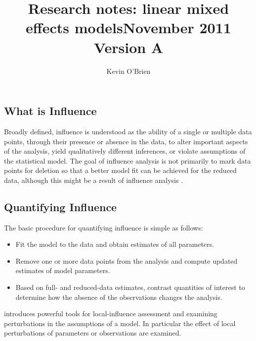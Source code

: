 \documentclass[12pt, a4paper]{report}
\title{Research notes: linear mixed effects models}
\author{ } \date{ }
\theoremstyle{plain}
\theoremstyle{definition}
\theoremstyle{remark}
\begin{document}
\author{Kevin O'Brien}
\title{November 2011 Version A}




\tableofcontents \setcounter{tocdepth}{1}





\subsection{What is Influence} %

Broadly defined, influence is understood as the ability of a single or multiple data points, through their presence or absence in the data, to alter important aspects of the analysis, yield qualitatively different inferences, or violate assumptions of the statistical model. The goal of influence analysis is not primarily to mark data
points for deletion so that a better model fit can be achieved for the reduced data, although this might be a result of influence analysis \citep{schabenberger}.

\subsection{Quantifying Influence}  %

The basic procedure for quantifying influence is simple as follows:

\begin{itemize}
\item Fit the model to the data and obtain estimates of all parameters.
\item Remove one or more data points from the analysis and compute updated estimates of model parameters.
\item Based on full- and reduced-data estimates, contrast quantities of interest to determine how the absence of the observations changes the analysis.
\end{itemize}

\citet{cook86} introduces powerful tools for local-influence assessment and examining perturbations in the assumptions of a model. In particular the effect of local perturbations of parameters or observations are examined.
\end{document}
